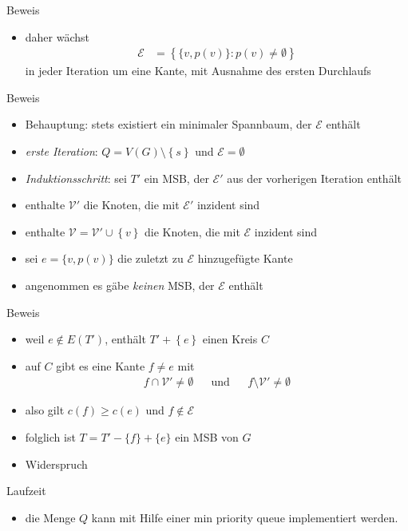\documentclass[aspectratio=1610, 11pt]{beamer}
\newcommand\cE{\mathcal E}
\newcommand\cV{\mathcal V}
\newcommand\cbc[1]{\left\{{#1}\right\}}
\begin{document}
\begin{frame}
\begin{overprint}
\begin{exampleblock}{Beweis}
\begin{itemize}
		\item daher w\"achst 
	\begin{align*}
		\cE&=\cbc{\{v,p(v)\}:p(v)\neq\emptyset}
	\end{align*}
			in jeder Iteration um eine Kante, mit Ausnahme des ersten Durchlaufs
	\end{itemize}
\end{exampleblock}
\begin{exampleblock}{Beweis}
	\begin{itemize}
		\item \alert{Behauptung:} stets existiert ein minimaler Spannbaum, der $\cE$ enth\"alt
		\item {\em erste Iteration}: $Q=V(G)\setminus\cbc s$ und $\cE=\emptyset$
		\item {\em Induktionsschritt}: sei $T'$ ein MSB, der $\cE'$ aus der vorherigen Iteration enth\"alt
		\item enthalte $\cV'$ die Knoten, die mit $\cE'$ inzident sind
		\item enthalte $\cV=\cV'\cup\cbc v$ die Knoten, die mit $\cE$ inzident sind
		\item sei $e=\{v,p(v)\}$ die zuletzt zu $\cE$ hinzugef\"ugte Kante
		\item angenommen es g\"abe \emph{keinen} MSB, der $\cE$ enth\"alt
	\end{itemize}
\end{exampleblock}
\begin{exampleblock}{Beweis}
	\begin{itemize}
		\item weil $e\not\in E(T')$, enth\"alt $T'+\cbc e$ einen Kreis $C$
		\item auf $C$ gibt es eine Kante $f\neq e$ mit
			\begin{align*}
				f\cap\cV'\neq\emptyset&&\mbox{und}&&f\setminus\cV'\neq\emptyset
			\end{align*}
		\item also gilt $c(f)\geq c(e)$ und $f\not\in\cE$
		\item folglich ist $T=T'-\{f\}+\{e\}$ ein MSB von $G$
		\item Widerspruch
	\end{itemize}
\end{exampleblock}
\begin{exampleblock}{Laufzeit}
	\begin{itemize}
		\item die Menge $Q$ kann mit Hilfe einer min priority queue implementiert werden.

\end{itemize}
\end{exampleblock}
\end{overprint}
\end{frame}
\end{document}

